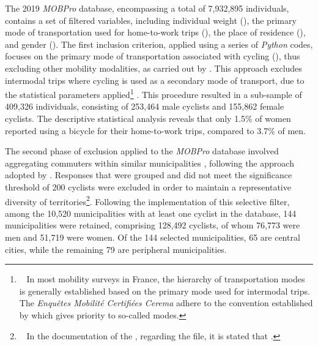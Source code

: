 \begin{refsegment}
The 2019 \textsl{MOBPro} database, encompassing a total of 7,932,895 individuals, contains a set of filtered variables, including individual weight (), the primary mode of transportation used for home-to-work trips (), the place of residence (), and gender (). The first inclusion criterion, applied using a series of \textsl{Python} codes, focuses on the primary mode of transportation associated with cycling (), thus excluding other mobility modalities, as carried out by \textcolor{blue}{\textcite[7]{raux_does_2021}}. This approach excludes intermodal trips where cycling is used as a secondary mode of transport, due to the statistical parameters applied\footnote{~
    In most mobility surveys in France, the hierarchy of transportation modes is generally established based on the primary mode used for intermodal trips. The \textsl{Enquêtes Mobilité Certifiées \acrshort{Cerema}} adhere to the convention established by \textcolor{blue}{\textcite[32]{cerema_enquetes_2020}} which gives priority to so-called  modes.
} \textcolor{blue}{\autocite[32]{cerema_enquetes_2020}}. This procedure resulted in a sub-sample of 409,326 individuals, consisting of 253,464 male cyclists and 155,862 female cyclists. The descriptive statistical analysis reveals that only 1.5\% of women reported using a bicycle for their home-to-work trips, compared to 3.7\% of men. %

The second phase of exclusion applied to the \textsl{MOBPro} database involved aggregating commuters within similar municipalities \textcolor{blue}{\autocite{insee_documentation_2023}}, following the approach adopted by \textcolor{blue}{\textcite[259]{papaix_potential_2022}}. Responses that were grouped and did not meet the significance threshold of 200 cyclists were excluded in order to maintain a representative diversity of territories\footnote{~
    In the documentation of the \textcolor{blue}{\textcite{insee_documentation_2023}}, regarding the  file, it is stated that .
}. Following the implementation of this selective filter, among the 10,520 municipalities with at least one cyclist in the database, 144 municipalities were retained, comprising 128,492 cyclists, of whom 76,773 were men and 51,719 were women. Of the 144 selected municipalities, 65 are central cities, while the remaining 79 are peripheral municipalities. %


\end{refsegment}

